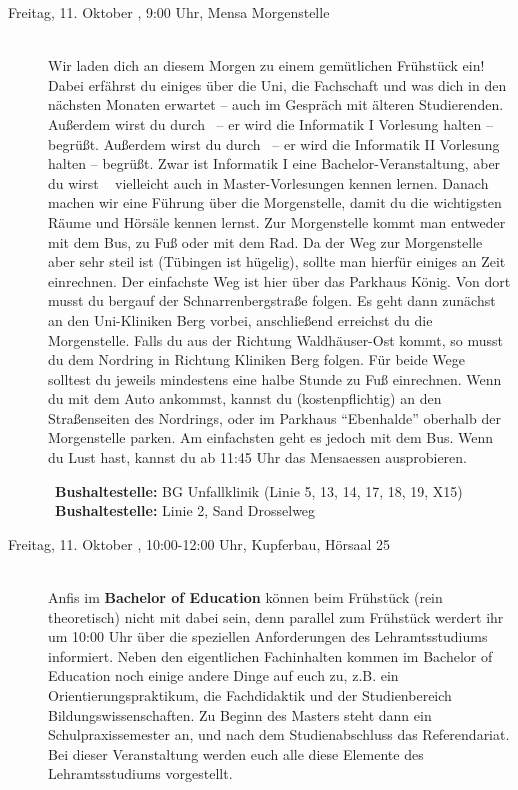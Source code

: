 \begin{description}
\else
    \item[Freitag, 11. Oktober \YEAR, 9:00 Uhr, Mensa Morgenstelle]\ \\
        Wir laden dich an diesem Morgen zu einem gemütlichen Frühstück ein! Dabei erfährst du einiges über die Uni, die Fachschaft und was dich in den nächsten Monaten erwartet -- auch im Gespräch mit älteren Studierenden.
    \ifwintersemester Außerdem wirst du durch \Infoprof~-- er wird die Informatik I Vorlesung halten -- begrüßt. \fi
    \ifsommersemester Außerdem wirst du durch \Infoprof~-- er wird die Informatik II Vorlesung halten -- begrüßt. \fi
    \ifmaster Zwar ist Informatik I eine Bachelor-Veranstaltung, aber du wirst \Infoprof~ vielleicht auch in Master-Vorlesungen kennen lernen. \fi
    \ifwintersemester
        Danach machen wir eine Führung über die Morgenstelle, damit du die wichtigsten Räume und Hörsäle kennen lernst.
        Zur Morgenstelle kommt man entweder mit dem Bus, zu Fuß oder mit dem Rad. Da der Weg zur Morgenstelle aber sehr steil ist (Tübingen ist hügelig), sollte man hierfür einiges an Zeit einrechnen.
        Der einfachste Weg ist hier über das Parkhaus König. Von dort musst du bergauf der Schnarrenbergstraße folgen. Es geht dann zunächst an den Uni-Kliniken Berg vorbei, anschließend erreichst du die Morgenstelle. Falls du aus der Richtung Waldh\"auser-Ost kommt, so musst du dem Nordring in Richtung Kliniken Berg folgen. Für beide Wege solltest du jeweils mindestens eine halbe Stunde zu Fuß einrechnen.
        Wenn du mit dem Auto ankommst, kannst du (kostenpflichtig) an den Straßenseiten des Nordrings, oder im Parkhaus "`Ebenhalde"' oberhalb der Morgenstelle parken. Am einfachsten geht es jedoch mit dem Bus.
        Wenn du Lust hast, kannst du ab 11:45 Uhr das Mensaessen ausprobieren.
    \fi

    \ifwintersemester {}~\textbf{Bushaltestelle:} BG Unfallklinik (Linie 5, 13, 14, 17, 18, 19, X15) \fi
    \ifsommersemester {}~\textbf{Bushaltestelle:} Linie 2, Sand Drosselweg \fi
\fi

\iflehramt
    \item[Freitag, 11. Oktober \YEAR, 10:00-12:00 Uhr, Kupferbau, Hörsaal 25]\ \\
        Anfis im \textbf{Bachelor of Education} können beim Frühstück (rein theoretisch) nicht mit dabei sein, denn parallel zum Frühstück werdert ihr um 10:00 Uhr über die speziellen Anforderungen des Lehramtsstudiums informiert. Neben den eigentlichen Fachinhalten kommen im Bachelor of Education noch einige andere Dinge auf euch zu, z.B. ein Orientierungspraktikum, die Fachdidaktik und der Studienbereich Bildungswissenschaften. Zu Beginn des Masters steht dann ein Schulpraxissemester an, und nach dem Studienabschluss das Referendariat. Bei dieser Veranstaltung werden euch alle diese Elemente des Lehramtsstudiums vorgestellt.


\end{description}
